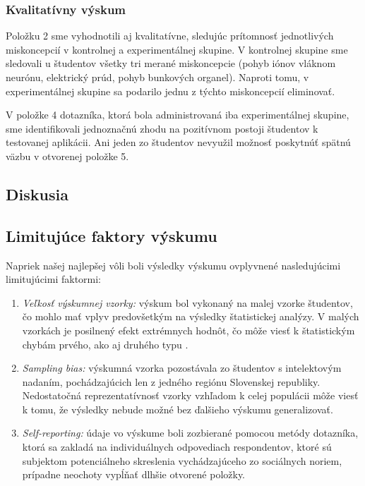 \subsubsection{Kvalitatívny výskum}
Položku 2 sme vyhodnotili aj kvalitatívne, sledujúc prítomnosť jednotlivých miskoncepcií v kontrolnej a experimentálnej skupine. V kontrolnej skupine sme sledovali u študentov všetky tri merané miskoncepcie 
(pohyb iónov vláknom neurónu, elektrický prúd, pohyb bunkových organel). Naproti tomu, v experimentálnej skupine sa podarilo jednu z týchto miskoncepcií eliminovať.

V položke 4 dotazníka, ktorá bola administrovaná iba experimentálnej skupine, sme identifikovali jednoznačnú zhodu na pozitívnom postoji študentov k testovanej aplikácii. Ani jeden zo študentov nevyužil možnosť poskytnúť
spätnú väzbu v otvorenej položke 5.

\subsection{Diskusia}

\subsection{Limitujúce faktory výskumu}
Napriek našej najlepšej vôli boli výsledky výskumu ovplyvnené nasledujúcimi limitujúcimi faktormi:

\begin{enumerate}
  \item \emph{Veľkosť výskumnej vzorky:} výskum bol vykonaný na malej vzorke študentov, čo mohlo mať vplyv predovšetkým na výsledky štatistickej analýzy. V malých vzorkách je posilnený efekt extrémnych hodnôt, 
  čo môže viesť k štatistickým chybám prvého, ako aj druhého typu \cite{komendaAnalyzaNahodnehoPedagogickem1981}.
  \item \emph{Sampling bias:} výskumná vzorka pozostávala zo študentov s intelektovým nadaním, pochádzajúcich len z jedného regiónu Slovenskej republiky. Nedostatočná reprezentatívnosť vzorky vzhľadom k celej populácii 
  môže viesť k tomu, že výsledky nebude možné bez ďalšieho výskumu generalizovať.
  \item \emph{Self-reporting:} údaje vo výskume boli zozbierané pomocou metódy dotazníka, ktorá sa zakladá na individuálnych odpovediach respondentov, ktoré sú subjektom potenciálneho skreslenia vychádzajúceho
  zo sociálnych noriem, prípadne neochoty vypĺňať dlhšie otvorené položky.
\end{enumerate}
